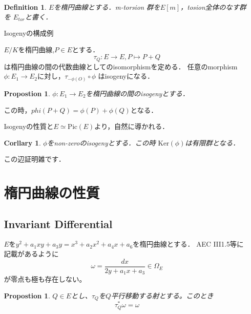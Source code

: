 \documentclass{ujarticle}
\newtheorem{dfn}[thm]{Definition}
\newtheorem{prop}[thm]{Propostion}
\newtheorem{cor}[thm]{Corllary}
\begin{document}
\begin{dfn}
 $E$を楕円曲線とする．m-torsion 群を$E[m]$，tosion全体のなす群を
 $E_{tor}$と書く．
\end{dfn}

Isogenyの構成例

$E/K$を楕円曲線,$P \in E$とする．
\begin{equation*}
  \tau_Q : E \to E ,P \mapsto P+Q
\end{equation*}
は楕円曲線の間の代数曲線としてのisomorphismを定める．
任意のmorphism$\phi:E_1 \to E_2$に対し，$\tau_{-\phi(O)}\circ \phi$
はisogenyになる．
\begin{prop}
 $\phi:E_1 \to E_2$を楕円曲線の間のisogenyとする．
\end{prop}
この時，$phi(P +Q)=\phi(P) + \phi(Q)$となる．

Isogenyの性質と$E \simeq \mathrm{Pic}(E)$より，自然に導かれる．

\begin{cor}
$\phi$をnon-zeroのisogenyとする．この時
  $\mathrm{Ker}(\phi)$は有限群となる．
\end{cor}
この辺証明雑です．

\section{楕円曲線の性質}
\label{subs:楕円曲線の性質}

\subsection{Invariant Differential}
\label{sub:Invariant Differential}

$E$を$y^2 + a_1xy + a_3 y = x^3 + a_2 x^2 + a_4 x + a_6$を楕円曲線とする．
AEC III1.5等に記載があるように
\begin{equation*}
  \omega = \frac{dx}{2y+a_1x +a_3} \in \Omega_E
\end{equation*}
が零点も極も存在しない。

\begin{prop}
 $Q \in E$とし、$\tau_Q$を$Q$平行移動する射とする。このとき
 \begin{equation*}
   \tau_Q^{*}\omega =\omega
 \end{equation*}
\end{prop}
\end{document}
